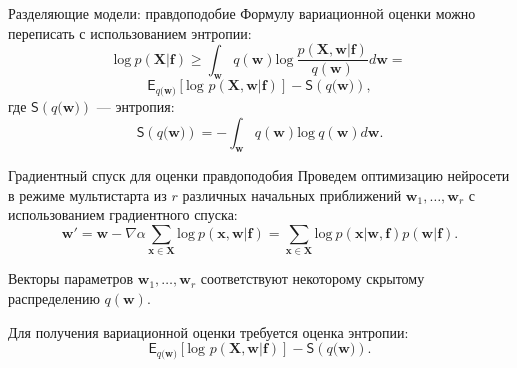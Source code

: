 \documentclass[10pt,pdf,utf8,russian,aspectratio=169]{beamer}
\begin{document}
\begin{frame}{Разделяющие модели: правдоподобие}
Формулу вариационной оценки можно переписать с использованием энтропии:
$$\text{log}~p(\mathbf{X}|\mathbf{f}) \geq 
\int_{\mathbf{w}} q(\mathbf{w})\text{log}~\frac{p(\mathbf{X},\mathbf{w}|\mathbf{f})}{q(\mathbf{w})}d\mathbf{w} = 
$$
$$
\mathsf{E}_{q(\mathbf{w)}}[\text{log~}p (\mathbf{X}, \mathbf{w}| \mathbf{f})] - \mathsf{S}({q(\mathbf{w)}}),
$$
где $\mathsf{S}({q(\mathbf{w)}})$ --- энтропия:
$$
\mathsf{S}({q(\mathbf{w)}}) = - \int_{\mathbf{w}} q(\mathbf{w})\text{log}~q(\mathbf{w})d\mathbf{w}.  	
$$
\end{frame}

\begin{frame}{Градиентный спуск для оценки правдоподобия}
Проведем оптимизацию нейросети в режиме мультистарта из $r$ различных начальных приближений $\mathbf{w}_1, \dots, \mathbf{w}_r$ с использованием градиентного спуска:
\[
\mathbf{w}' = \mathbf{w} - \nabla \alpha \sum_{\mathbf{x} \in \mathbf{X}} \text{log}~p(\mathbf{x},\mathbf{w}|\mathbf{f}) = \sum_{\mathbf{x} \in \mathbf{X}} \text{log}~p(\mathbf{x}|\mathbf{w}, \mathbf{f}) p(\mathbf{w}|\mathbf{f}).
\]

Векторы параметров $\mathbf{w}_1,\dots,\mathbf{w}_r$ соответствуют некоторому скрытому распределению $q(\mathbf{w})$.

Для получения вариационной оценки требуется оценка энтропии:
$$
\mathsf{E}_{q(\mathbf{w)}}[\text{log~}p (\mathbf{X}, \mathbf{w}| \mathbf{f})] - \mathsf{S}({q(\mathbf{w)}}).
$$


\end{frame}
\end{document}

